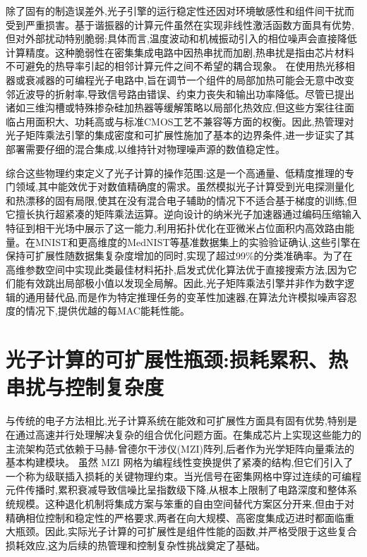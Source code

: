 \documentclass[11pt]{article}
\begin{document}
除了固有的制造误差外,光子引擎的运行稳定性还因对环境敏感性和组件间干扰而受到严重损害。基于谐振器的计算元件虽然在实现非线性激活函数方面具有优势,但对外部扰动特别脆弱;具体而言,温度波动和机械振动引入的相位噪声会直接降低计算精度。这种脆弱性在密集集成电路中因热串扰而加剧,热串扰是指由芯片材料不可避免的热导率引起的相邻计算元件之间不希望的耦合现象。\citep{doi_10_1109_access_2020_3013116_8fec1fb2} 在使用热光移相器或衰减器的可编程光子电路中,旨在调节一个组件的局部加热可能会无意中改变邻近波导的折射率,导致信号路由错误、约束力丧失和输出功率降低。尽管已提出诸如三维沟槽或特殊掺杂硅加热器等缓解策略以局部化热效应,但这些方案往往面临占用面积大、功耗高或与标准CMOS工艺不兼容等方面的权衡。因此,热管理对光子矩阵乘法引擎的集成密度和可扩展性施加了基本的边界条件,进一步证实了其部署需要仔细的混合集成,以维持针对物理噪声源的数值稳定性。\citep{doi_10_3390_nano14080697_c372a140} \citep{doi_10_1109_access_2020_3013116_8fec1fb2}

综合这些物理约束定义了光子计算的操作范围:这是一个高通量、低精度推理的专门领域,其中能效优于对数值精确度的需求。虽然模拟光子计算受到光电探测量化和热漂移的固有局限,使其在没有混合电子辅助的情况下不适合基于梯度的训练,但它擅长执行超紧凑的矩阵乘法运算。逆向设计的纳米光子加速器通过编码压缩输入特征到相干光场中展示了这一能力,利用拓扑优化在亚微米占位面积内高效路由能量。在MNIST和更高维度的MedNIST等基准数据集上的实验验证确认,这些引擎在保持可扩展性随数据集复杂度增加的同时,实现了超过99\%的分类准确率。为了在高维参数空间中实现此类最佳材料拓扑,启发式优化算法优于直接搜索方法,因为它们能有效跳出局部极小值以发现全局解。因此,光子矩阵乘法引擎并非作为数字逻辑的通用替代品,而是作为特定推理任务的变革性加速器,在算法允许模拟噪声容忍度的情况下,提供优越的每MAC能耗性能。\citep{doi_10_1038_s41467_026_68648_1_26658a9c} \citep{s2_cea9e6112f363e19aa754d2681622ab07650c71c_7db5c737} \citep{doi_10_3390_nano14080697_c372a140} \citep{doi_10_1515_nanoph_2022_0423_38a2c3ec}

\section{光子计算的可扩展性瓶颈:损耗累积、热串扰与控制复杂度}\label{ux5149ux5b50ux8ba1ux7b97ux7684ux53efux6269ux5c55ux6027ux74f6ux9888ux635fux8017ux7d2fux79efux70edux4e32ux6270ux4e0eux63a7ux5236ux590dux6742ux5ea6}

与传统的电子方法相比,光子计算系统在能效和可扩展性方面具有固有优势,特别是在通过高速并行处理解决复杂的组合优化问题方面。在集成芯片上实现这些能力的主流架构范式依赖于马赫-曾德尔干涉仪(MZI)阵列,后者作为光学矩阵向量乘法的基本构建模块。\citep{doi_10_1088_1402_4896_ae8345_3b948559} 虽然 MZI 网格为编程线性变换提供了紧凑的结构,但它们引入了一个称为级联插入损耗的关键物理约束。当光信号在密集网格中穿过连续的可编程元件传播时,累积衰减导致信噪比呈指数级下降,从根本上限制了电路深度和整体系统规模。这种退化机制将集成方案与笨重的自由空间替代方案区分开来,但由于对精确相位控制和稳定性的严格要求,两者在向大规模、高密度集成迈进时都面临重大瓶颈。因此,实际光子计算的可扩展性是组件性能的函数,并严格受限于这些复合损耗效应,这为后续的热管理和控制复杂性挑战奠定了基础。\citep{doi_10_1088_1402_4896_ae8345_3b948559} \citep{doi_10_3390_nano14080697_c372a140}
\end{document}
